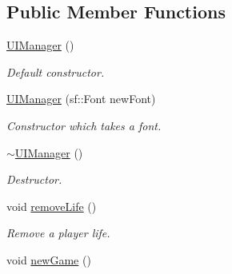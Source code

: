 \subsection*{Public Member Functions}
\begin{DoxyCompactItemize}
\item 
\hypertarget{class_u_i_manager_a32b72c377f864f7cd197e6ffe738142f}{\hyperlink{class_u_i_manager_a32b72c377f864f7cd197e6ffe738142f}{U\+I\+Manager} ()}\label{class_u_i_manager_a32b72c377f864f7cd197e6ffe738142f}

\begin{DoxyCompactList}\small\item\em Default constructor. \end{DoxyCompactList}\item 
\hyperlink{class_u_i_manager_a89c46c8540da2a38b859eaa5dfb4243a}{U\+I\+Manager} (sf\+::\+Font new\+Font)
\begin{DoxyCompactList}\small\item\em Constructor which takes a font. \end{DoxyCompactList}\item 
\hypertarget{class_u_i_manager_aeac3e2a8fd4ba49821ce653f4d2fa6b6}{\hyperlink{class_u_i_manager_aeac3e2a8fd4ba49821ce653f4d2fa6b6}{$\sim$\+U\+I\+Manager} ()}\label{class_u_i_manager_aeac3e2a8fd4ba49821ce653f4d2fa6b6}

\begin{DoxyCompactList}\small\item\em Destructor. \end{DoxyCompactList}\item 
\hypertarget{class_u_i_manager_afcb9f18d87b7e95ad5632bffeb48f56f}{void \hyperlink{class_u_i_manager_afcb9f18d87b7e95ad5632bffeb48f56f}{remove\+Life} ()}\label{class_u_i_manager_afcb9f18d87b7e95ad5632bffeb48f56f}

\begin{DoxyCompactList}\small\item\em Remove a player life. \end{DoxyCompactList}\item 
\hypertarget{class_u_i_manager_aff0a63e6d0d7ae9f26cdd415c3151f3f}{void \hyperlink{class_u_i_manager_aff0a63e6d0d7ae9f26cdd415c3151f3f}{new\+Game} ()}\label{class_u_i_manager_aff0a63e6d0d7ae9f26cdd415c3151f3f}


\end{DoxyCompactItemize}
